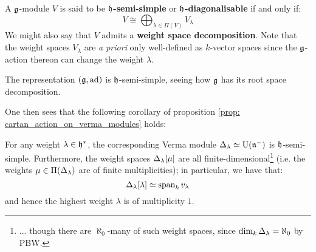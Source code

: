         \begin{definition} \label{def: cartan_semi_simple_modules}
            A $\mathfrak{g}$-module $V$ is said to be \textbf{$\mathfrak{h}$-semi-simple} or \textbf{$\mathfrak{h}$-diagonalisable} if and only if:
                $$V \cong \bigoplus_{\lambda \in \Pi(V)} V_{\lambda}$$
            We might also say that $V$ admits a \textbf{weight space decomposition}. Note that the weight spaces $ V_{\lambda}$ are \textit{a priori} only well-defined as $k$-vector spaces since the $\mathfrak{g}$-action thereon can change the weight $\lambda$. 
        \end{definition}
        \begin{example}
            The representation $(\mathfrak{g}, \mathrm{ad})$ is $\mathfrak{h}$-semi-simple, seeing how $\mathfrak{g}$ has its root space decomposition. 
        \end{example}
        One then sees that the following corollary of proposition \ref{prop: cartan_action_on_verma_modules} holds:
        \begin{corollary} \label{coro: verma_modules_are_cartan_semi_simple}
            For any weight $\lambda \in \mathfrak{h}^*$, the corresponding Verma module $\Delta_{\lambda} \simeq \mathrm{U}(\mathfrak{n}^-)$ is $\mathfrak{h}$-semi-simple. Furthermore, the weight spaces $\Delta_{\lambda}[\mu]$ are all finite-dimensional\footnote{... though there are $\aleph_0$-many of such weight spaces, since $\dim_k \Delta_{\lambda} = \aleph_0$ by PBW.} (i.e. the weights $\mu \in \Pi(\Delta_{\lambda})$ are of finite multiplicities); in particular, we have that:
                $$\Delta_{\lambda}[\lambda] \simeq \operatorname{span}_k v_{\lambda}$$
            and hence the highest weight $\lambda$ is of multiplicity $1$. 
        \end{corollary}

